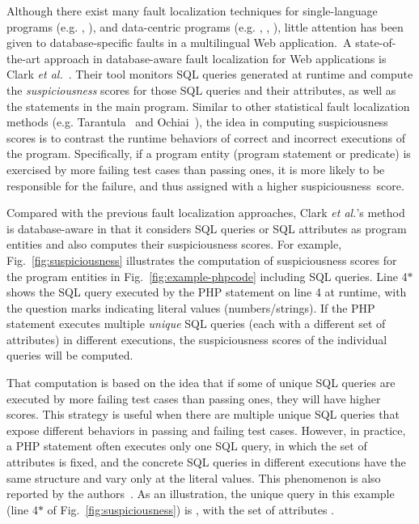 Although there exist many fault localization techniques for
single-language programs (e.g. \cite{abreu-ochiai-07},
\cite{tarantula05}),
and data-centric programs (e.g. \cite{dor-issta08}, \cite{litvak10},
\cite{saha11}), little attention has been given to database-specific
faults in a multilingual Web application.~A state-of-the-art approach
in database-aware fault localization for Web applications is
Clark {\em et al.}~\cite{ga-ase11}. Their tool monitors SQL queries
generated at runtime and compute the \emph{suspiciousness} scores for
those SQL queries and their attributes, as well as the
statements in the main program. Similar to other statistical fault
localization methods (e.g. Tarantula~\cite{tarantula05} and
Ochiai~\cite{abreu-ochiai-07}), the idea in computing
suspiciousness scores is to contrast the runtime behaviors of correct
and incorrect executions of the program. Specifically, if a program
entity (program statement or predicate) is exercised by more failing
test cases than passing ones, it is more likely to be responsible for
the failure, and thus assigned with a higher suspiciousness~score.

Compared with the previous fault localization approaches, Clark {\em
et al.}'s method~\cite{ga-ase11} is database-aware in that it
considers SQL queries or SQL attributes as program entities and also
computes their 
suspiciousness scores. For example, Fig.~\ref{fig:suspiciousness}
illustrates the computation of suspiciousness scores for the program
entities in Fig.~\ref{fig:example-phpcode} including SQL
queries. Line 4$\ast$ shows the SQL query executed by the PHP
statement  on line 4 at runtime, with the question
marks indicating literal values (numbers/strings). If the PHP
 statement executes multiple \emph{unique} SQL
queries (each with a different set of attributes) in different
executions, the suspiciousness scores of the individual queries will
be computed.

That computation is based on the idea that if some of unique
SQL queries are executed by more failing test cases than passing ones,
they will have higher scores. This strategy is useful when there are
multiple unique SQL queries that expose different behaviors in passing
and failing test cases. However, in practice, a PHP
 statement often executes only one SQL
query, in which the set of attributes is fixed, and the concrete SQL
queries in different executions have the same structure and vary only
at the literal values. This phenomenon is also reported by the
authors~\cite{ga-ase11}. As an illustration, the unique query
in this example (line 4$\ast$ of Fig.~\ref{fig:suspiciousness}) is
, with the set of attributes .

